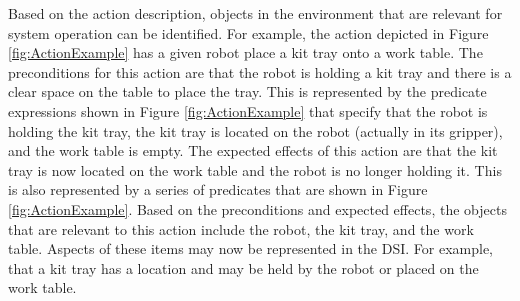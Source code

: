 Based on the action description, objects in the environment that are relevant
for system operation can be identified. For example, the action depicted in Figure \ref{fig:ActionExample}
has a given robot place a kit tray onto a work table. The preconditions for this action are that
the robot is holding a kit tray and there is a clear space on the table to place the tray. This is
represented by the predicate expressions shown in Figure \ref{fig:ActionExample} that specify that
the robot is holding the kit tray, the kit tray is located on the robot (actually in its gripper), and
the work table is empty. The expected effects of this action are that the kit tray is now located
on the work table and the robot is no longer holding it. This is also represented by a series
of predicates that are shown in Figure \ref{fig:ActionExample}. Based on the preconditions and expected effects,
the objects that are relevant to this action include the robot, the kit tray, and the work table.
Aspects of these items may now be represented in the DSI. For example, that a kit tray has a location and may
be held by the robot or placed on the work table.

